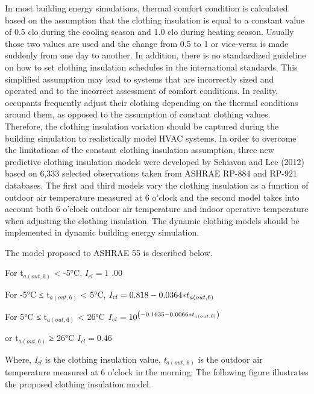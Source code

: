 In most building energy simulations, thermal comfort condition is calculated based on the assumption that the clothing insulation is equal to a constant value of 0.5 clo during the cooling season and 1.0 clo during heating season. Usually those two values are used and the change from 0.5 to 1 or vice-versa is made suddenly from one day to another. In addition, there is no standardized guideline on how to set clothing insulation schedules in the international standards. This simplified assumption may lead to systems that are incorrectly sized and operated and to the incorrect assessment of comfort conditions. In reality, occupants frequently adjust their clothing depending on the thermal conditions around them, as opposed to the assumption of constant clothing values. Therefore, the clothing insulation variation should be captured during the building simulation to realistically model HVAC systems. In order to overcome the limitations of the constant clothing insulation assumption, three new predictive clothing insulation models were developed by Schiavon and Lee (2012) based on 6,333 selected observations taken from ASHRAE RP-884 and RP-921 databases. The first and third models vary the clothing insulation as a function of outdoor air temperature measured at 6 o'clock and the second model takes into account both 6 o'clock outdoor air temperature and indoor operative temperature when adjusting the clothing insulation. The dynamic clothing models should be implemented in dynamic building energy simulation.

The model proposed to ASHRAE 55 is described below.

For t\(_{a(out,6)}\) \textless{} -5°C, \({I_{cl}} = 1\) .00

For -5°C ≤ t\(_{a(out,6)}\) \textless{} 5°C, \({I_{cl}} = 0.818 - 0.0364{\rm{*}}{t_{a\left( {out,6} \right)}}\)

For 5°C ≤ t\(_{a(out,6)}\) \textless{} 26°C \({I_{cl}} = {10^{\left( { - 0.1635 - 0.0066{\rm{*}}{t_{a\left( {out,6} \right)}}} \right)}}\)

or t\(_{a(out,6)}\) ≥ 26°C \({I_{cl}} = 0.46\)

Where, \emph{I\(_{cl}\)} is the clothing insulation value, \emph{t\(_{a(out,\, 6)}\)} is the outdoor air temperature measured at 6 o'clock in the morning. The following figure illustrates the proposed clothing insulation model.

